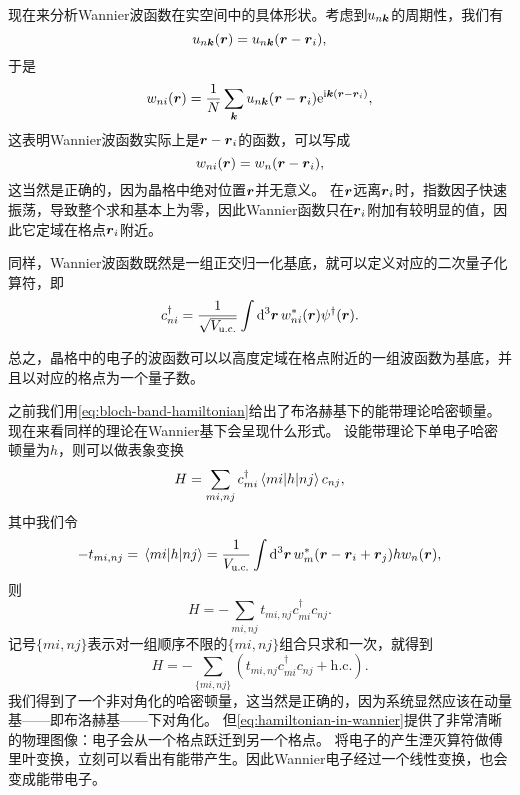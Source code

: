 \documentclass[hyperref, UTF8, a4paper]{ctexart}
\newcommand*{\ii}{\mathrm{i}}
\newcommand*{\ee}{\mathrm{e}}
\begin{document}
现在来分析Wannier波函数在实空间中的具体形状。考虑到$u_{n\vb*{k}}$的周期性，我们有
\[
    u_{n\vb*{k}} (\vb*{r}) = u_{n\vb*{k}} (\vb*{r} - \vb*{r}_i),
\]
于是
\begin{equation}
    w_{ni}(\vb*{r}) = \frac{1}{N} \sum_{\vb*{k}} u_{n\vb*{k}} (\vb*{r} - \vb*{r}_i) \ee^{\ii \vb*{k} (\vb*{r} - \vb*{r}_i)},
\end{equation}
这表明Wannier波函数实际上是$\vb*{r} - \vb*{r}_i$的函数，可以写成
\begin{equation}
    w_{ni}(\vb*{r}) = w_{n}(\vb*{r} - \vb*{r}_i),
\end{equation}
这当然是正确的，因为晶格中绝对位置$\vb*{r}$并无意义。
在$\vb*{r}$远离$\vb*{r}_i$时，指数因子快速振荡，导致整个求和基本上为零，因此Wannier函数只在$\vb*{r}_i$附加有较明显的值，因此它定域在格点$\vb*{r}_i$附近。

同样，Wannier波函数既然是一组正交归一化基底，就可以定义对应的二次量子化算符，即
\begin{equation}
    {c}^\dagger_{ni} = \frac{1}{\sqrt{V_\text{u.c.}}} \int \dd[3]{\vb*{r}} w_{ni}^*(\vb*{r}) {\psi}^\dagger(\vb*{r}).
\end{equation}

总之，晶格中的电子的波函数可以以高度定域在格点附近的一组波函数为基底，并且以对应的格点为一个量子数。

之前我们用\eqref{eq:bloch-band-hamiltonian}给出了布洛赫基下的能带理论哈密顿量。现在来看同样的理论在Wannier基下会呈现什么形式。
设能带理论下单电子哈密顿量为${h}$，则可以做表象变换
\[
    {H} = \sum_{mi, nj} {c}^\dagger_{mi} \mel{mi}{{h}}{nj} {c}_{nj},
\]
其中我们令
\begin{equation}
    - t_{mi, nj} = \mel{mi}{{h}}{nj} = \frac{1}{V_\text{u.c.}} \int \dd[3]{\vb*{r}} w_m^*(\vb*{r} - \vb*{r}_i + \vb*{r}_j) {h} w_n(\vb*{r}),
\end{equation}
则
\[
    {H} = - \sum_{mi, nj} t_{mi, nj} {c}^\dagger_{mi} {c}_{nj}.
\]
记号$\{mi, nj\}$表示对一组顺序不限的$\{mi, nj\}$组合只求和一次，就得到
\begin{equation}
    {H} = - \sum_{\{mi, nj\}} (t_{mi, nj} {c}_{mi}^\dagger {c}_{nj} + \text{h.c.}).
    \label{eq:hamiltonian-in-wannier}
\end{equation}
我们得到了一个非对角化的哈密顿量，这当然是正确的，因为系统显然应该在动量基——即布洛赫基——下对角化。
但\eqref{eq:hamiltonian-in-wannier}提供了非常清晰的物理图像：电子会从一个格点跃迁到另一个格点。
将电子的产生湮灭算符做傅里叶变换，立刻可以看出有能带产生。因此Wannier电子经过一个线性变换，也会变成能带电子。
\end{document}
